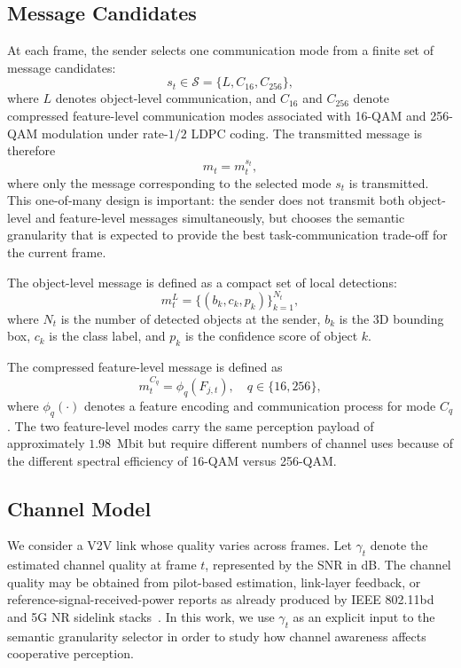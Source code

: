 \documentclass[journal]{IEEEtran}
\begin{document}
\subsection{Message Candidates}

At each frame, the sender selects one communication mode from a finite set of message candidates:
\begin{equation}
s_t \in \mathcal{S} = \{L, C_{16}, C_{256}\},
\label{eq:action_set}
\end{equation}
where $L$ denotes object-level communication, and $C_{16}$ and $C_{256}$ denote compressed feature-level communication modes associated with 16-QAM and 256-QAM modulation under rate-$1/2$ LDPC coding. The transmitted message is therefore
\begin{equation}
m_t = m_t^{s_t},
\end{equation}
where only the message corresponding to the selected mode $s_t$ is transmitted. This one-of-many design is important: the sender does not transmit both object-level and feature-level messages simultaneously, but chooses the semantic granularity that is expected to provide the best task-communication trade-off for the current frame.

The object-level message is defined as a compact set of local detections:
\begin{equation}
m_t^L = \{(b_k, c_k, p_k)\}_{k=1}^{N_t},
\end{equation}
where $N_t$ is the number of detected objects at the sender, $b_k$ is the 3D bounding box, $c_k$ is the class label, and $p_k$ is the confidence score of object $k$.

The compressed feature-level message is defined as
\begin{equation}
m_t^{C_q} = \phi_q(F_{j,t}), \quad q \in \{16, 256\},
\end{equation}
where $\phi_q(\cdot)$ denotes a feature encoding and communication process for mode $C_q$. The two feature-level modes carry the same perception payload of approximately $1.98$~Mbit but require different numbers of channel uses because of the different spectral efficiency of 16-QAM versus 256-QAM.

\subsection{Channel Model}

We consider a V2V link whose quality varies across frames. Let $\gamma_t$ denote the estimated channel quality at frame $t$, represented by the SNR in dB. The channel quality may be obtained from pilot-based estimation, link-layer feedback, or reference-signal-received-power reports as already produced by IEEE 802.11bd and 5G NR sidelink stacks~\cite{ieee80211bd}. In this work, we use $\gamma_t$ as an explicit input to the semantic granularity selector in order to study how channel awareness affects cooperative perception.
\end{document}
